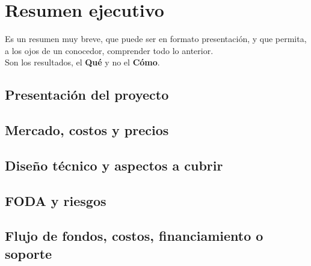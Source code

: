 \section{Resumen ejecutivo}
{\consigna
Es un resumen muy breve, que puede ser en formato presentación, y que permita, a los ojos de un conocedor, comprender todo lo anterior.\\
Son los resultados, el {\bf Qué} y no el {\bf Cómo}.
}

\subsection{Presentación del proyecto}
\subsection{Mercado, costos y precios}
\subsection{Diseño técnico y aspectos a cubrir}
\subsection{FODA y riesgos}
\subsection{Flujo de fondos, costos, financiamiento o soporte}